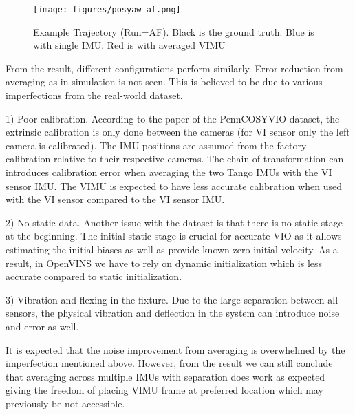\documentclass[conference]{IEEEtran}
\begin{document}
\begin{figure}
    \centering
    \texttt{[image: figures/posyaw\_af.png]}
    \caption{Example Trajectory (Run=AF). Black is the ground truth. Blue is with single IMU. Red is with averaged VIMU}
    \label{fig:posyaw_af}
\end{figure}

From the result, different configurations perform similarly. Error reduction from averaging as in simulation is not seen. This is believed to be due to various imperfections from the real-world dataset.

1) Poor calibration. According to the paper of the PennCOSYVIO dataset, the extrinsic calibration is only done between the cameras (for VI sensor only the left camera is calibrated). The IMU positions are assumed from the factory calibration relative to their respective cameras. The chain of transformation can introduces calibration error when averaging the two Tango IMUs with the VI sensor IMU. The VIMU is expected to have less accurate calibration when used with the VI sensor compared to the VI sensor IMU.

2) No static data. Another issue with the dataset is that there is no static stage at the beginning. The initial static stage is crucial for accurate VIO as it allows estimating the initial biases as well as provide known zero initial velocity. As a result, in OpenVINS we have to rely on dynamic initialization which is less accurate compared to static initialization.

3) Vibration and flexing in the fixture. Due to the large separation between all sensors, the physical vibration and deflection in the system can introduce noise and error as well.

It is expected that the noise improvement from averaging is overwhelmed by the imperfection mentioned above. However, from the result we can still conclude that averaging across multiple IMUs with separation does work as expected giving the freedom of placing VIMU frame at preferred location which may previously be not accessible.
\end{document}
